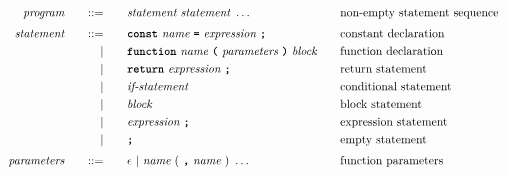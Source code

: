 







\begin{alignat*}{9}
&& \textit{program}    &&\quad ::= &\quad && \textit{statement} \ \textit{statement} \ \ldots
                                                           && \textrm{non-empty statement sequence} \\[1mm]
&& \textit{statement}    &&\quad ::= &\quad && \textbf{\texttt{const}}\  \textit{name} \ 
                                           \textbf{\texttt{=}}\  \textit{expression} \ \textbf{\texttt{;}}
                                                           && \textrm{constant declaration} \\
&&                       && |   &\quad && \textbf{\texttt{function}}\  \textit{name} \ 
                                   \textbf{\texttt{(}}\  \textit{parameters} \ \textbf{\texttt{)}}\ \textit{block} \quad
                                                           && \textrm{function declaration}\\
&&                       && |   &\quad && \textbf{\texttt{return}}\  \textit{expression} \ \textbf{\texttt{;}}
                                                           && \textrm{return statement}\\
&&                       && |   &\quad && \textit{if-statement} \quad
                                                           && \textrm{conditional statement}\\
&&                       && |   &\quad &&  \textit{block} 
                                                           && \textrm{block statement}\\
&&                       && |   &\quad &&  \textit{expression} \ \textbf{\texttt{;}}
                                                           && \textrm{expression statement} \\
&&                       && |   &\quad &&  \textbf{\texttt{;}}
                                                           && \textrm{empty statement} \\[1mm] 
&& \textit{parameters}   && ::= &\quad &&  \epsilon\ | \  \textit{name} \ 
                                                   (\ \textbf{\texttt{,}} \ \textit{name}\ )\ \ldots
                                                            && \textrm{function parameters}   \\[1mm]

\end{alignat*}
